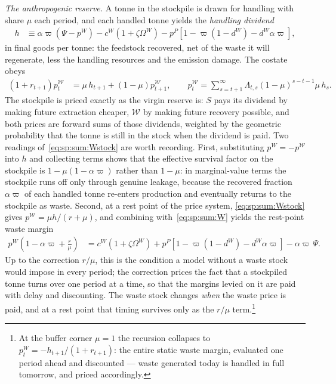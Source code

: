\emph{The anthropogenic reserve.} A tonne in the stockpile is drawn for handling with share $\mu$ each period, and each handled tonne yields the \emph{handling dividend}
\begin{align}
h &\equiv \alpha\varpi\left(\Psi-p^W\right)-c^W\left(1+\zeta\Omega^W\right)-p^P\left[1-\varpi\left(1-d^W\right)-d^W\alpha\varpi\right],
\label{eq:sp:sum:h}
\end{align}
in final goods per tonne: the feedstock recovered, net of the waste it will regenerate, less the handling resources and the emission damage. The costate obeys
\begin{align}
\left(1+r_{t+1}\right)p^{\mathcal W}_t &= \mu\,h_{t+1}+\left(1-\mu\right)p^{\mathcal W}_{t+1},
\qquad
p^{\mathcal W}_t=\sum_{s=t+1}^\infty \Lambda_{t,s}\left(1-\mu\right)^{s-t-1}\mu\,h_s .
\label{eq:sp:sum:Wstock}
\end{align}
The stockpile is priced exactly as the virgin reserve is: $S$ pays its dividend by making future extraction cheaper, $\mathcal W$ by making future recovery possible, and both prices are forward sums of those dividends, weighted by the geometric probability that the tonne is still in the stock when the dividend is paid. Two readings of~\eqref{eq:sp:sum:Wstock} are worth recording. First, substituting $p^W=-p^{\mathcal W}$ into $h$ and collecting terms shows that the effective survival factor on the stockpile is $1-\mu\left(1-\alpha\varpi\right)$ rather than $1-\mu$: in marginal-value terms the stockpile runs off only through genuine leakage, because the recovered fraction $\alpha\varpi$ of each handled tonne re-enters production and eventually returns to the stockpile as waste. Second, at a rest point of the price system, \eqref{eq:sp:sum:Wstock} gives $p^{\mathcal W}=\mu h/\left(r+\mu\right)$, and combining with~\eqref{eq:sp:sum:W} yields the rest-point waste margin
\begin{align}
p^W\left(1-\alpha\varpi+\frac{r}{\mu}\right) &= c^W\left(1+\zeta\Omega^W\right)+p^P\left[1-\varpi\left(1-d^W\right)-d^W\alpha\varpi\right]-\alpha\varpi\,\Psi .
\label{eq:sp:sum:W-limit}
\end{align}
Up to the correction $r/\mu$, this is the condition a model without a waste stock would impose in every period; the correction prices the fact that a stockpiled tonne turns over one period at a time, so that the margins levied on it are paid with delay and discounting. The waste stock changes \emph{when} the waste price is paid, and at a rest point that timing survives only as the $r/\mu$ term.\footnote{At the buffer corner $\mu=1$ the recursion collapses to $p^W_t=-h_{t+1}/\left(1+r_{t+1}\right)$: the entire static waste margin, evaluated one period ahead and discounted --- waste generated today is handled in full tomorrow, and priced accordingly.}


